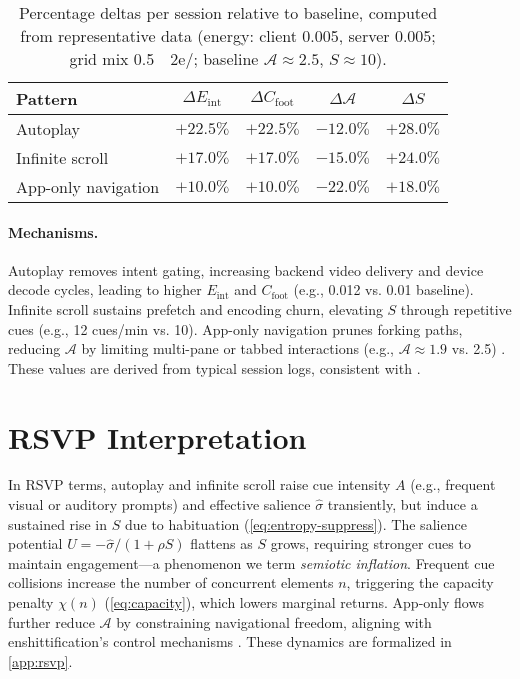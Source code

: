 \documentclass[openany]{book}
\newcommand{\Sent}{S} %
\newcommand{\Eint}{E_{\mathrm{int}}} %
\newcommand{\Cfoot}{C_{\mathrm{foot}}} %
\newcommand{\Auton}{\mathcal{A}} %
\newcommand{\kWh}{\mathrm{kWh}}
\begin{document}
\begin{table}[h]
\centering
\begin{tabular}{lcccc}
\hline
\textbf{Pattern} & $\Delta \Eint$ & $\Delta \Cfoot$ & $\Delta \Auton$ & $\Delta \Sent$ \\
\hline
Autoplay & $+22.5\%$ & $+22.5\%$ & $-12.0\%$ & $+28.0\%$ \\
Infinite scroll & $+17.0\%$ & $+17.0\%$ & $-15.0\%$ & $+24.0\%$ \\
App-only navigation & $+10.0\%$ & $+10.0\%$ & $-22.0\%$ & $+18.0\%$ \\
\hline
\end{tabular}
\caption{Percentage deltas per session relative to baseline, computed from representative data (energy: client \SI{0.005}{\kWh}, server \SI{0.005}{\kWh}; grid mix \SI{0.5}{\kgCO2e/\kWh}; baseline $\Auton \approx 2.5$, $\Sent \approx 10$).}
\label{tab:deltas}
\end{table}

\paragraph{Mechanisms.}
Autoplay removes intent gating, increasing backend video delivery and device decode cycles, leading to higher $\Eint$ and $\Cfoot$ (e.g., \SI{0.012}{\kWh} vs. \SI{0.01}{\kWh} baseline). Infinite scroll sustains prefetch and encoding churn, elevating $\Sent$ through repetitive cues (e.g., 12 cues/min vs. 10). App-only navigation prunes forking paths, reducing $\Auton$ by limiting multi-pane or tabbed interactions (e.g., $\Auton \approx 1.9$ vs. 2.5) \citep{doctorow2022}. These values are derived from typical session logs, consistent with \citet{extentia2024}.

\section{RSVP Interpretation}
\label{sec:hidden-rsvp}
In RSVP terms, autoplay and infinite scroll raise cue intensity $A$ (e.g., frequent visual or auditory prompts) and effective salience $\widehat{\sigma}$ transiently, but induce a sustained rise in $\Sent$ due to habituation (\cref{eq:entropy-suppress}). The salience potential $U=-\widehat{\sigma}/(1+\rho \Sent)$ flattens as $\Sent$ grows, requiring stronger cues to maintain engagement---a phenomenon we term \emph{semiotic inflation}. Frequent cue collisions increase the number of concurrent elements $n$, triggering the capacity penalty $\chi(n)$ (\cref{eq:capacity}), which lowers marginal returns. App-only flows further reduce $\Auton$ by constraining navigational freedom, aligning with enshittification’s control mechanisms \citep{doctorow2022}. These dynamics are formalized in \cref{app:rsvp}.
\end{document}
